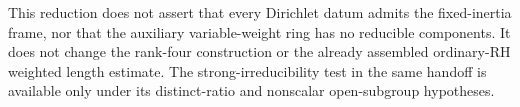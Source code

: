 This reduction does not assert that every Dirichlet datum
admits the fixed-inertia frame, nor that the auxiliary
variable-weight ring has no reducible components.  It
does not change the rank-four construction or the already
assembled ordinary-RH weighted length estimate.
The strong-irreducibility test in the same handoff is
available only under its distinct-ratio and nonscalar
open-subgroup hypotheses.
